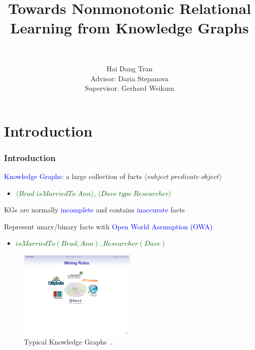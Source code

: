 \documentclass{beamer}
\title{Towards Nonmonotonic Relational Learning from Knowledge Graphs}
\author[Stepanova]
 {
   \large{}\\
 }
\author[shortname]{Hai Dang Tran\\Advisor: Daria Stepanova\\Supervisor: Gerhard Weikum}
\institute[shortinst]{Max Planck Institute for Informatics\\
                      Saarland University, Saarbr\"{u}cken, Germany}
\date[]{}
\newcommand{\tuple}[1]{\ensuremath{\langle#1\rangle}}
\newcommand{\bl}[1]{\textcolor{blue}{#1}}
\newcommand{\gr}[1]{\textcolor{darkgreen}{#1}}
\newcommand{\mi}[1]{\ensuremath{\mathit{#1}}}
\begin{document}
\frame{\titlepage}
\addtocounter{framenumber}{-1}


\section{Introduction}
\begin{frame}\frametitle{Introduction}
\medskip
\begin{itemize}
\small{\item \textcolor{blue}{Knowledge Graphs}: a large collection of facts $\tuple{subject\;predicate\;object}$
\begin{itemize}
\item[] \gr{$\tuple{\mi{Brad\;isMarriedTo\;Ann}}$, $\tuple{\mi{Dave \;type\;Researcher}}$}
\end{itemize}
\bigskip

\item KGs are normally \bl{incomplete} and contains \bl{inaccurate} facts
\bigskip

\item Represent unary/binary facts with \textcolor{blue}{Open World Assumption (OWA)}
\begin{itemize}
\item[] \gr{$\mi{isMarriedTo(Brad,Ann), Researcher(Dave)}$}
\end{itemize}

}
\end{itemize}

\begin{figure}[ht]
\includegraphics[width=0.5\textwidth]{kb}
\caption{Typical Knowledge Graphs~\cite{rumis}.}
\end{figure}


\end{frame}
\end{document}
